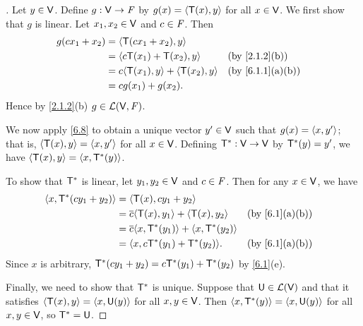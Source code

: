 \begin{proof}[]
  Let \(y \in \mathsf{V}\).
  Define \(g : \mathsf{V} \to \mathit{F}\) by \(g(x) = \left\langle\mathsf{T}(x), y\right\rangle\) for all \(x \in \mathsf{V}\).
  We first show that \(g\) is linear.
  Let \(x_1, x_2 \in \mathsf{V}\) and \(c \in \mathit{F}\).
  Then
  \begin{align*}
    g(c x_1 + x_2) & = \inn{\T(c x_1 + x_2), y}                                                  \\
                   & = \inn{c \T(x_1) + \T(x_2), y}          &  & \text{(by \cref{2.1.2}(b))}    \\
                   & = c \inn{\T(x_1), y} + \inn{\T(x_2), y} &  & \text{(by \cref{6.1.1}(a)(b))} \\
                   & = c g(x_1) + g(x_2).
  \end{align*}
  Hence by \cref{2.1.2}(b) \(g \in \mathcal{L}(\mathsf{V}, \mathit{F})\).

  We now apply \cref{6.8} to obtain a unique vector \(y' \in \mathsf{V}\) such that \(g(x) = \left\langle x, y'\right\rangle\);
  that is, \(\left\langle\mathsf{T}(x), y\right\rangle = \left\langle x, y'\right\rangle\) for all \(x \in \mathsf{V}\).
  Defining \(\mathsf{T}^* : \mathsf{V} \to \mathsf{V}\) by \(\mathsf{T}^*(y) = y'\), we have \(\left\langle\mathsf{T}(x), y\right\rangle = \left\langle x, \mathsf{T}^*(y)\right\rangle\).

  To show that \(\mathsf{T}^*\) is linear, let \(y_1, y_2 \in \mathsf{V}\) and \(c \in \mathit{F}\).
  Then for any \(x \in \mathsf{V}\),
  we have
  \begin{align*}
    \inn{x, \T^*(c y_1 + y_2)} & = \inn{\T(x), c y_1 + y_2}                                                           \\
                               & = \conj{c} \inn{\T(x), y_1} + \inn{\T(x), y_2}     &  & \text{(by \cref{6.1}(a)(b))} \\
                               & = \conj{c} \inn{x, \T^*(y_1)} + \inn{x, \T^*(y_2)}                                   \\
                               & = \inn{x, c \T^*(y_1) + \T^*(y_2)}.                &  & \text{(by \cref{6.1}(a)(b))}
  \end{align*}
  Since \(x\) is arbitrary, \(\mathsf{T}^*(c y_1 + y_2) = c \mathsf{T}^*(y_1) + \mathsf{T}^*(y_2)\) by \cref{6.1}(e).

  Finally, we need to show that \(\mathsf{T}^*\) is unique. Suppose that \(\mathsf{U} \in \mathcal{L}(\mathsf{V})\) and that it satisfies \(\left\langle\mathsf{T}(x), y\right\rangle = \left\langle x, \mathsf{U}(y)\right\rangle\) for all \(x, y \in \mathsf{V}\).
  Then \(\left\langle x, \mathsf{T}^*(y)\right\rangle = \left\langle x, \mathsf{U}(y)\right\rangle\) for all \(x, y \in \mathsf{V}\), so \(\mathsf{T}^* = \mathsf{U}\).
\end{proof}

